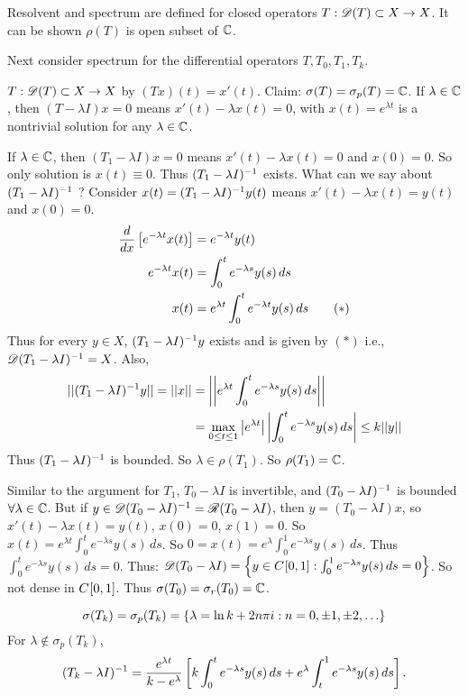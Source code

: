 \documentclass[]{article}
\begin{document}
\begin{recall}
	Resolvent and spectrum are defined for closed operators $T:\mathscr{D}(T)\subset X\rightarrow X$.
	It can be shown $\rho(T)$ is open subset of $\mathbb{C}$.
\end{recall}
Next consider spectrum for the differential operators $T,T_0,T_1,T_k$.
\begin{example}
	[$X=\Cb{}01,\ms D(T)=\Cb101$] $T:\mathscr{D}(T)\subset X\rightarrow X$ by $(Tx)(t)=x'(t)$.
	Claim: $\sigma(T) = \sigma_p(T)=\mathbb{C}$.
	If $\lambda\in\mathbb{C}$, then $(T-\lambda I)x=0$ means $x'(t)-\lambda x(t)=0$, with $x(t)=e^{\lambda t}$ is a nontrivial solution for any $\lambda\in\mathbb{C}$.
\end{example}
\begin{example}
	[$T_1$ where $\ms D(T_1)=\setc{x\in\Cb101}{x(0)=0}$]
	If $\lambda\in\mathbb{C}$, then $(T_1-\lambda I)x=0$ means $x'(t)-\lambda x(t)=0$ and $x(0)=0$. So only solution is $x(t)\equiv 0$.
	Thus $(T_1-\lambda I)^{-1}$ exists. What can we say about $(T_1-\lambda I)^{-1}$ ?
	Consider $x(t)=(T_1-\lambda I)^{-1} y(t)$ means $x'(t)-\lambda x(t)=y(t)$ and $x(0)=0$.
	\begin{align*}
		\frac d{dx}\left[e^{-\lambda t}x(t)\right] &= e^{-\lambda t}y(t) \\
		e^{-\lambda t}x(t) &= \int_0^t e^{-\lambda s}y(s)\,ds \\
		x(t) &= e^{\lambda t}\int_0^t e^{-\lambda t} y(s)\,ds \qquad (*)
	\end{align*}
	Thus for every $y\in X$, $(T_1-\lambda I)^{-1} y$ exists and is given by $(*)$ i.e., $\mathscr{D}(T_1-\lambda I)^{-1} = X$.
	Also,
	\begin{align*}
		||(T_1-\lambda I)^{-1} y|| = ||x|| 
		&= \left|\left|e^{\lambda t}\int_0^t e^{-\lambda s} y(s)\,ds\right|\right| \\
		&= \max_{0\leq t\leq1} \left|e^{\lambda t}\right| \left|\int_0^t e^{-\lambda s}y(s)\,ds\right|
		\leq k||y||
	\end{align*}
	Thus $(T_1-\lambda I)^{-1}$ is bounded. So $\lambda\in\rho(T_1)$. So $\rho(T_1)=\mathbb{C}$.
\end{example}
\begin{example}
	[$T_0$ where $\ms D(T_0)=\setc{x\in\Cb101}{x(0)=0,x(1)=0}$]
	Similar to the argument for $T_1$, $T_0-\lambda I$ is invertible, and $(T_0-\lambda I)^{-1}$ is bounded $\forall\lambda\in\mathbb{C}$.
	But if $y\in\mathscr{D}(T_0-\lambda I)^{-1}=\mathscr{R}(T_0-\lambda I)$, then $y=(T_0-\lambda I)x$, so $x'(t)-\lambda x(t)=y(t)$, $x(0)=0$, $x(1)=0$.
	So $x(t)=e^{\lambda t}\int_0^t e^{-\lambda s}y(s)\,ds$.
	So $0 = x(t) = e^\lambda \int_0^1 e^{-\lambda s}y(s)\,ds$.
	Thus $\int_0^t e^{-\lambda s}y(s)\,ds=0$.
	Thus: $\mathscr{D}(T_0-\lambda I)=\left\{ y\in C^{}{[}0,1{]} : \int_0^1e^{-\lambda s}y(s)\,ds=0 \right\}$.
	So not dense in $C^{}{[}0,1{]}$. Thus $\sigma(T_0)=\sigma_r(T_0)=\mathbb{C}$.
\end{example}
\begin{example}
	[$T_k$ where $\ms D(T_k)=\setc{x\in\Cb101}{x(1)=k\,x(0)}$]
	$$\sigma(T_k) = \sigma_p(T_k) = \setc{\lambda=\ln k+2n\pi i}{n=0,\pm 1,\pm 2,\dots}$$
	For $\lambda\notin\sigma_p(T_k)$, $$(T_k-\lambda I)^{-1} = \frac{e^{\lambda t}}{k-e^\lambda}\left[ k\int_0^te^{-\lambda s}y(s)\,ds + e^\lambda \int_t^1 e^{-\lambda s}y(s)\,ds\right].$$
\end{example}
\end{document}
